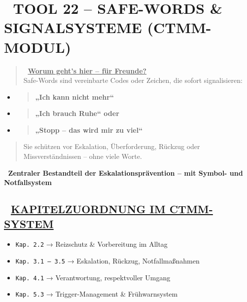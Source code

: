 %


\hypertarget{tool-22-safe-words-signalsysteme-ctmm-modul}{%
\section{\texorpdfstring{\textbf{🛑 TOOL 22 -- SAFE-WORDS \& SIGNALSYSTEME (CTMM-MODUL)}}{🛑 TOOL 22 -- SAFE-WORDS \& SIGNALSYSTEME (CTMM-MODUL)}}\label{tool-22-safe-words-signalsysteme-ctmm-modul}}

\begin{quote}
🧠 \textbf{\ul{Worum geht's hier -- für Freunde?}}\\
Safe-Words sind vereinbarte Codes oder Zeichen, die sofort signalisieren:
\end{quote}

\begin{itemize}
\item
  \begin{quote}
  \textbf{„Ich kann nicht mehr``}
  \end{quote}
\item
  \begin{quote}
  \textbf{„Ich brauch Ruhe`` oder}
  \end{quote}
\item
  \begin{quote}
  \textbf{„Stopp -- das wird mir zu viel``}
  \end{quote}
\end{itemize}

\begin{quote}
Sie schützen vor Eskalation, Überforderung, Rückzug oder Missverständnissen -- ohne viele Worte.
\end{quote}

🧩 \textbf{Zentraler Bestandteil der Eskalationsprävention -- mit Symbol- und Notfallsystem}

\hypertarget{kapitelzuordnung-im-ctmm-system}{%
\subsection{\texorpdfstring{📘 \textbf{\ul{KAPITELZUORDNUNG IM CTMM-SYSTEM}}}{📘 KAPITELZUORDNUNG IM CTMM-SYSTEM}}\label{kapitelzuordnung-im-ctmm-system}}

\begin{itemize}
\tightlist
\item
  \texttt{Kap.\ }\texttt{2.2} → Reizschutz \& Vorbereitung im Alltag
\item
  \texttt{Kap.\ }\texttt{3.1\ –\ 3.5} → Eskalation, Rückzug, Notfallmaßnahmen
\item
  \texttt{Kap.\ }\texttt{4.1} → Verantwortung, respektvoller Umgang
\item
  \texttt{Kap.\ }\texttt{5.3} → Trigger-Management \& Frühwarnsystem
\end{itemize}

